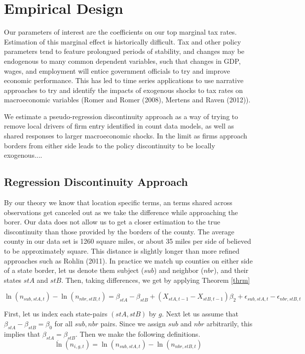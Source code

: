 \section{Empirical Design}

Our parameters of interest are the coefficients on our top marginal tax rates. Estimation of this marginal effect is historically difficult. Tax and other policy parameters tend to feature prolongued periods of stability, and changes may be endogenous to many common dependent variables, such that changes in GDP, wages, and employment will entice government officials to try and improve economic performance. This has led to time series applications to use narrative approaches to try and identify the impacts of exogenous shocks to tax rates on macroeconomic variables (Romer and Romer (2008), Mertens and Raven (2012)). 

We estimate a pseudo-regression discontinuity approach as a way of trying to remove local drivers of firm entry identified in count data models, as well as shared responses to larger macroeconomic shocks. In the limit as firms approach borders from either side leads to the policy discontinuity to be locally exogenous....

\subsection{Regression Discontinuity Approach}

By our theory we know that location specific terms, an terms shared across observations get canceled out as we take the difference while approaching the borer. Our data does not allow us to get a closer estimation to the true discontinuity than those provided by the borders of the county. The average county in our data set is 1260 square miles, or about 35 miles per side of believed to be approximately square. This distance is slightly longer than more refined approaches such as Rohlin (2011). In practice we match up counties on either side of a state border, let us denote them subject ($sub$) and neighbor ($nbr$), and their states $stA$ and $stB$. Then, taking differences, we get by applying Theorem \ref{thrm}

\begin{equation}
\ln(n_{sub,stA,t})-\ln(n_{nbr,stB,t}) = \beta_{stA}-\beta_{stB}+(X_{stA,t-1}-X_{stB,t-1})\beta_{2} + \epsilon_{sub,stA,t}-\epsilon_{nbr,stB,t}
\end{equation}

First, let us index each state-pairs $(stA,stB)$ by $g$. Next let us assume that $\beta_{stA}-\beta_{stB} = \beta_{0}$ for all $sub, nbr$ pairs. Since we assign $sub$ and $nbr$ arbitrarily, this implies that $\beta_{stA} = \beta_{stB}$.  Then we make the following definitions.
\begin{equation}
\ddot \ln(n_{i,g,t}) = \ln(n_{sub,stA,t})-\ln(n_{nbr,stB,t})
\end{equation}


